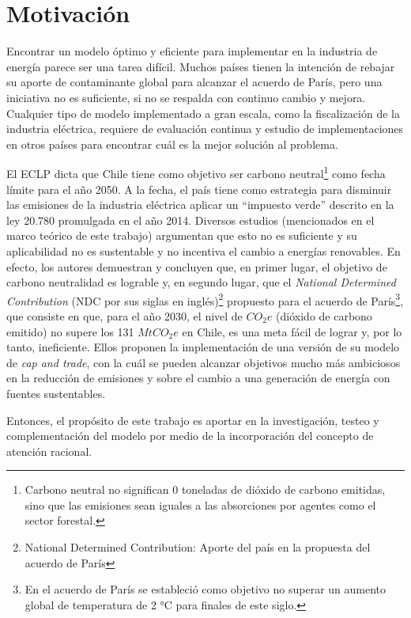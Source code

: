 \section{Motivación}
Encontrar un modelo óptimo y eficiente para implementar en la industria de energía parece ser una tarea difícil. Muchos países tienen la intención de rebajar su aporte de contaminante global para alcanzar el acuerdo de París, pero una iniciativa no es suficiente, si no se respalda con continuo cambio y mejora. Cualquier tipo de modelo implementado a gran escala, como la fiscalización de la industria eléctrica, requiere de evaluación continua y estudio de implementaciones en otros países para encontrar cuál es la mejor solución al problema.
\vspace{2.5mm}

El ECLP dicta que Chile tiene como objetivo ser carbono neutral\footnote{Carbono neutral no significan 0 toneladas de dióxido de carbono emitidas, sino que las emisiones sean iguales a las absorciones por agentes como el sector forestal.} como fecha límite para el año 2050. A la fecha, el país tiene como estrategia para disminuir las emisiones de la industria eléctrica aplicar un ``impuesto verde'' descrito en la ley 20.780 promulgada en el año 2014. Diversos estudios (mencionados en el marco teórico de este trabajo) argumentan que esto no es suficiente y su aplicabilidad no es sustentable y no incentiva el cambio a energías renovables. En efecto, los autores  demuestran y concluyen que, en primer lugar, el objetivo de carbono neutralidad es lograble y, en segundo lugar, que el \emph{National Determined Contribution}  (NDC por sus siglas en inglés)\footnote{National Determined Contribution: Aporte del país en la propuesta del acuerdo de París}  propuesto para el acuerdo de París\footnote{En el acuerdo de París se estableció como objetivo no superar un aumento global de temperatura de 2 °C para finales de este siglo.}, que consiste en que, para el año 2030, el nivel de $CO_2 e$ (dióxido de carbono emitido) no supere los 131 $MtCO_2 e$ en Chile, es una meta fácil de lograr y, por lo tanto, ineficiente. Ellos proponen la implementación de una versión de su modelo de \emph{cap and trade}, con la cuál se pueden alcanzar objetivos mucho más ambiciosos en la reducción de emisiones y sobre el cambio a una generación de energía con fuentes sustentables.
\vspace{2.5mm}

Entonces, el propósito de este trabajo es aportar en la investigación, testeo y complementación del modelo por medio de la incorporación del concepto de atención racional.
\vspace{2.5mm}

